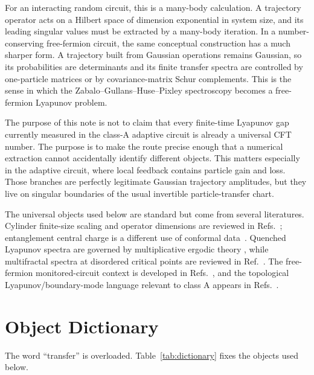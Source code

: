 \documentclass[aps,prb,onecolumn,nofootinbib,superscriptaddress]{revtex4-2}
\theoremstyle{plain}
\theoremstyle{definition}
\begin{document}
For an interacting random circuit, this is a many-body calculation.  A
trajectory operator acts on a Hilbert space of dimension exponential in system
size, and its leading singular values must be extracted by a many-body
iteration.  In a number-conserving free-fermion circuit, the same conceptual
construction has a much sharper form.  A trajectory built from Gaussian
operations remains Gaussian, so its probabilities are determinants and its
finite transfer spectra are controlled by one-particle matrices or by
covariance-matrix Schur complements.  This is the sense in which the
Zabalo--Gullans--Huse--Pixley spectroscopy becomes a free-fermion Lyapunov
problem.

The purpose of this note is not to claim that every finite-time Lyapunov gap
currently measured in the class-A adaptive circuit is already a universal CFT
number.  The purpose is to make the route precise enough that a numerical
extraction cannot accidentally identify different objects.  This matters
especially in the adaptive circuit, where local feedback contains particle
gain and loss.  Those branches are perfectly legitimate Gaussian trajectory
amplitudes, but they live on singular boundaries of the usual invertible
particle-transfer chart.

The universal objects used below are standard but come from several
literatures.  Cylinder finite-size scaling and operator dimensions are reviewed
in Refs.~\cite{Cardy1986,DiFrancesco1997}; entanglement central charge is a
different use of conformal data~\cite{CalabreseCardy2004}.  Quenched
Lyapunov spectra are governed by multiplicative ergodic theory
\cite{Oseledets1968,FurstenbergKesten1960}, while multifractal spectra at
disordered critical points are reviewed in Ref.~\cite{EversMirlin2008}.  The
free-fermion monitored-circuit context is developed in
Refs.~\cite{JianBauerKeselmanLudwig2022,AlbertonBuchholdDiehl2021,Fava2023,
Poboiko2023,ChahineBuchhold2024}, and the topological Lyapunov/boundary-mode
language relevant to class A appears in
Refs.~\cite{LudwigSchulzBaldesStolz2013,XiaoKawabata2024,BhuiyanPanJian2026}.

\section{Object Dictionary}
\label{sec:dictionary}

The word ``transfer'' is overloaded.  Table~\ref{tab:dictionary} fixes the
objects used below.
\end{document}
